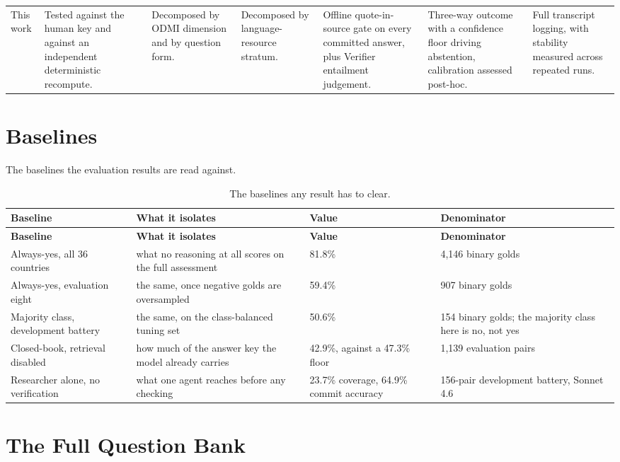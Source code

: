 {\begin{longtable}[]{@{}
  L{0.1427}
  L{0.1428}
  L{0.1429}
  L{0.1427}
  L{0.1428}
  L{0.1430}
  L{0.1429}@{}}
This work & Tested against the human key and against an independent deterministic recompute. & Decomposed by ODMI dimension and by question form. & Decomposed by language-resource stratum. & Offline quote-in-source gate on every committed answer, plus Verifier entailment judgement. & Three-way outcome with a confidence floor driving abstention, calibration assessed post-hoc. & Full transcript logging, with stability measured across repeated runs. \\
\end{longtable}
}


\chapter{Baselines}\label{app:baselines}

The baselines the evaluation results are read against.


{\small
\begin{longtable}[]{@{}
  L{0.2157}
  L{0.3039}
  L{0.2059}
  L{0.2745}@{}}
\caption{The baselines any result has to clear.}\label{tab:baselines}\\
\toprule\noalign{}
\textbf{Baseline} & \textbf{What it isolates} & \textbf{Value} & \textbf{Denominator} \\
\midrule\noalign{}
\endfirsthead
\toprule\noalign{}
\textbf{Baseline} & \textbf{What it isolates} & \textbf{Value} & \textbf{Denominator} \\
\midrule\noalign{}
\endhead
\bottomrule\noalign{}
\endlastfoot
Always-yes, all 36 countries & what no reasoning at all scores on the full assessment & 81.8\% & 4,146 binary golds \\
Always-yes, evaluation eight & the same, once negative golds are oversampled & 59.4\% & 907 binary golds \\
Majority class, development battery & the same, on the class-balanced tuning set & 50.6\% & 154 binary golds; the majority class here is no, not yes \\
Closed-book, retrieval disabled & how much of the answer key the model already carries & 42.9\%, against a 47.3\% floor & 1,139 evaluation pairs \\
Researcher alone, no verification & what one agent reaches before any checking & 23.7\% coverage, 64.9\% commit accuracy & 156-pair development battery, Sonnet 4.6 \\
\end{longtable}
}

\chapter{The Full Question Bank}\label{app:question-bank}

